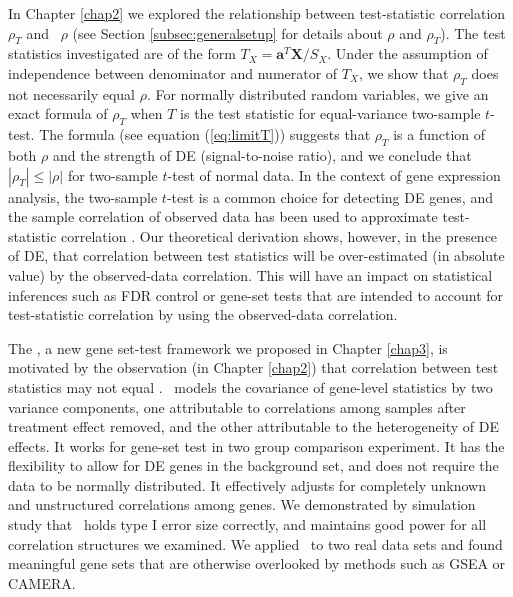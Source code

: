 In Chapter \ref{chap2} we explored the relationship between test-statistic correlation $\rho_T$
and \popucor~$\rho$ (see Section \ref{subsec:generalsetup} for details about $\rho$ and 
$\rho_T$). The test statistics investigated are of the form $T_X = \bm a^T\bm 
X/S_X$. Under the assumption of independence between denominator and numerator of $T_X$, we show 
that $\rho_T$ does not necessarily equal $\rho$. For normally distributed 
random variables, we give an exact formula of $\rho_T$ when $T$ is the test statistic for 
equal-variance two-sample $t$-test. The formula (see equation (\ref{eq:limitT})) suggests that 
$\rho_T$ is a function of both $\rho$ and the strength of DE (signal-to-noise ratio), and we 
conclude that $|\rho_T|\leq 
|\rho|$ for two-sample $t$-test of normal data. In the context of gene expression analysis, the 
two-sample $t$-test is a common choice for 
detecting DE genes, and the sample correlation of observed data has been used to approximate 
test-statistic correlation \cite{barry2008statistical,efron2007correlation,wu2012camera}. Our 
theoretical derivation shows, however, in the presence of DE, that correlation between test 
statistics will be over-estimated (in absolute value) by the observed-data correlation. This will 
have an impact on statistical inferences such as 
FDR control or gene-set tests that are intended to account for test-statistic
correlation by using the observed-data correlation.

The \OurMethod, a new gene set-test framework we proposed in Chapter \ref{chap3}, is motivated by 
the observation (in Chapter \ref{chap2}) that correlation between test statistics may not equal 
\popucor. \OurMethod~models the covariance 
of gene-level statistics by two variance components, one 
attributable to correlations among samples after treatment effect 
removed, and the other attributable to the heterogeneity of DE effects. It works for gene-set test 
in two group comparison experiment. It has the flexibility to allow for DE genes in the 
background set, and does not require the data to be normally distributed. It effectively adjusts 
for completely unknown and unstructured correlations among genes. 
 We demonstrated by simulation study that \OurMethod~holds type I error size 
correctly, and maintains good power for all correlation structures we examined. We applied
\OurMethod~to two real data sets and found meaningful gene sets that are otherwise overlooked by 
methods such as GSEA or CAMERA.


